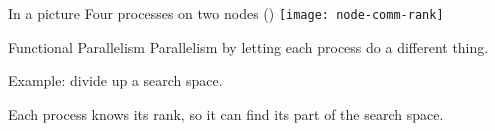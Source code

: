 
\begin{frame}{In a picture}
  Four processes on two nodes ()
  \texttt{[image: node-comm-rank]}
\end{frame}


\begin{frame}{Functional Parallelism}
  Parallelism by letting each process do a different thing.

  Example: divide up a search space.

  Each process knows its rank, so it can find its part of the search space.
\end{frame}

\begin{exerciseframe}[prime]
  
\end{exerciseframe}

\endinput

\begin{frame}[containsverbatim]\frametitle{}
\begin{lstlisting}
  
\end{lstlisting}
\end{frame}

